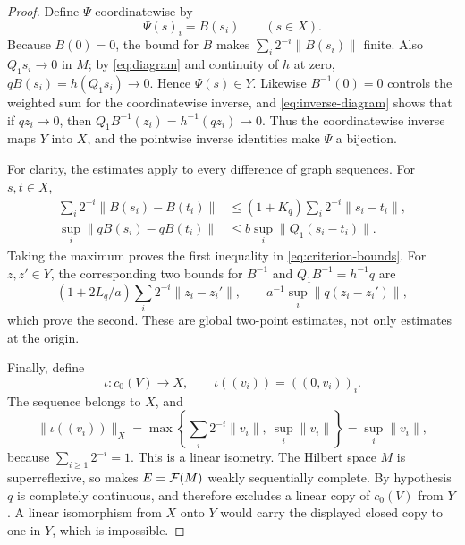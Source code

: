 \begin{proof}
Define \(\Psi\) coordinatewise by
\begin{equation}
\label{eq:Psi-coordinatewise}
 \Psi(s)_i=B(s_i)\qquad(s\in X).
\end{equation}
Because \(B(0)=0\), the bound for \(B\) makes
\(\sum_i2^{-i}\|B(s_i)\|\) finite. Also \(Q_1s_i\to0\) in \(M\);
by \eqref{eq:diagram} and continuity of \(h\) at zero,
\(qB(s_i)=h(Q_1s_i)\to0\). Hence \(\Psi(s)\in Y\).
Likewise \(B^{-1}(0)=0\) controls the weighted sum for the
coordinatewise inverse, and \eqref{eq:inverse-diagram} shows that
if \(qz_i\to0\), then \(Q_1B^{-1}(z_i)=h^{-1}(qz_i)\to0\).
Thus the coordinatewise inverse maps \(Y\) into \(X\), and the
pointwise inverse identities make \(\Psi\) a bijection.

For clarity, the estimates apply to every difference of graph
sequences. For \(s,t\in X\),
\begin{align*}
 \sum_i2^{-i}\|B(s_i)-B(t_i)\|
 &\le(1+K_q)\sum_i2^{-i}\|s_i-t_i\|,\\
 \sup_i\|qB(s_i)-qB(t_i)\|
 &\le b\sup_i\|Q_1(s_i-t_i)\|.
\end{align*}
Taking the maximum proves the first inequality in
\eqref{eq:criterion-bounds}. For \(z,z'\in Y\), the corresponding
two bounds for \(B^{-1}\) and \(Q_1B^{-1}=h^{-1}q\) are
\[
 (1+2L_q/a)\sum_i2^{-i}\|z_i-z_i'\|,
 \qquad
 a^{-1}\sup_i\|q(z_i-z_i')\|,
\]
which prove the second. These are global two-point estimates, not
only estimates at the origin.

Finally, define
\[
 \iota:c_0(V)\to X,\qquad \iota((v_i))=((0,v_i))_i.
\]
The sequence belongs to \(X\), and
\[
 \|\iota((v_i))\|_X
 =\max\left\{\sum_i2^{-i}\|v_i\|,\ \sup_i\|v_i\|\right\}
 =\sup_i\|v_i\|,
\]
because \(\sum_{i\ge1}2^{-i}=1\). This is a linear isometry.
The Hilbert space \(M\) is superreflexive, so 
makes \(E=\mathcal F(M)\) weakly sequentially complete. By hypothesis \(q\)
is completely continuous, and  therefore
excludes a linear copy of \(c_0(V)\) from \(Y\). A linear isomorphism
from \(X\) onto \(Y\) would carry the displayed closed copy to one in
\(Y\), which is impossible.
\end{proof}

